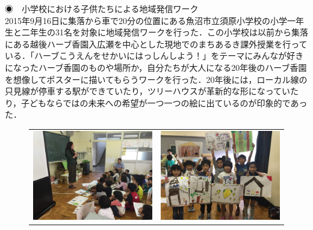 \documentclass[a4paper]{jsarticle}
\begin{document}
\begin{itemize}
\subsubsubsection ◉　小学校における子供たちによる地域発信ワーク\\
2015年9月16日に集落から車で20分の位置にある魚沼市立須原小学校の小学一年生と二年生の31名を対象に地域発信ワークを行った．この小学校は以前から集落にある越後ハーブ香園入広瀬を中心とした現地でのまちあるき課外授業を行っている．「ハーブこうえんをせかいにはっしんしよう！」をテーマにみんなが好きになったハーブ香園のものや場所か，自分たちが大人になる20年後のハーブ香園を想像してポスターに描いてもらうワークを行った．20年後には，ローカル線の只見線が停車する駅ができていたり，ツリーハウスが革新的な形になっていたり，子どもならではの未来への希望が一つ一つの絵に出ているのが印象的であった．

\begin{figure}[H]
  \begin{center}
    \begin{tabular}{cc}

    \begin{minipage}{0.5\hsize}
	\includegraphics[width=\hsize]{./images/06.jpg}
    \end{minipage}
    &
    \begin{minipage}{0.5\hsize}
      \includegraphics[width=\hsize]{./images/07.jpg}
    \end{minipage}


\end{tabular}
\end{center}
\end{figure}
\end{itemize}
\end{document}

